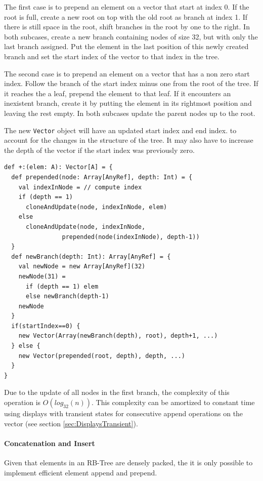 The first case is to prepend an element on a vector that start at index 0. If the root is full, create a new root on top with the old root as branch at index 1. If there is still space in the root, shift branches in the root by one to the right. In both sub\-cases, create a new branch containing nodes of size 32, but with only the last branch assigned. Put the element in the last position of this newly created branch and set the start index of the vector to that index in the tree.

The second case is to prepend an element on a vector that has a non zero start index. Follow the branch of the start index minus one from the root of the tree. If it reaches the a leaf, prepend the element to that leaf. If it encounters an inexistent branch, create it by putting the element in its rightmost position and leaving the rest empty. In both sub\-cases update the parent nodes up to the root.

The new \texttt{Vector} object will have an updated start index and end index. to account for the changes in the structure of the tree. It may also have to increase the depth of the vector if the start index was previously zero. 

\begin{lstlisting}[frame=single]
def +:(elem: A): Vector[A] = {
  def prepended(node: Array[AnyRef], depth: Int) = {
    val indexInNode = // compute index
    if (depth == 1) 
      cloneAndUpdate(node, indexInNode, elem)
    else 
      cloneAndUpdate(node, indexInNode, 
                prepended(node(indexInNode), depth-1))
  }
  def newBranch(depth: Int): Array[AnyRef] = {
    val newNode = new Array[AnyRef](32)
    newNode(31) = 
      if (depth == 1) elem 
      else newBranch(depth-1)
    newNode
  }
  if(startIndex==0) {
    new Vector(Array(newBranch(depth), root), depth+1, ...)
  } else {
    new Vector(prepended(root, depth), depth, ...)  
  }
}
\end{lstlisting}

Due to the update of all nodes in the first branch, the complexity of this operation is $O(log_{32}(n))$. This complexity can be amortized to constant time using displays with transient states for consecutive append operations on the vector (see section \ref{sec:DisplaysTransient}).


\paragraph{Concatenation and Insert}
Given that elements in an RB-Tree are densely packed, the it is only possible to implement efficient element append and prepend.


